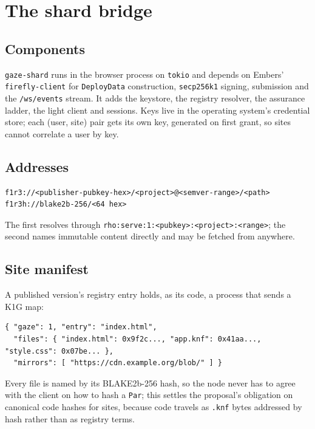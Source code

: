 \documentclass[11pt]{article}
\theoremstyle{definition}
\theoremstyle{remark}
\newcommand{\code}[1]{\texttt{#1}}
\begin{document}
\section{The shard bridge}\label{sec:shard}

\subsection{Components}
\code{gaze-shard} runs in the browser process on \code{tokio} and depends on
Embers' \code{firefly-client} for \code{DeployData} construction, \code{secp256k1}
signing, submission and the \code{/ws/events} stream. It adds the keystore, the
registry resolver, the assurance ladder, the light client and sessions. Keys live in
the operating system's credential store; each (user, site) pair gets its own key,
generated on first grant, so sites cannot correlate a user by key.

\subsection{Addresses}
\begin{lstlisting}
f1r3://<publisher-pubkey-hex>/<project>@<semver-range>/<path>
f1r3h://blake2b-256/<64 hex>
\end{lstlisting}
The first resolves through \code{rho:serve:1:<pubkey>:<project>:<range>}; the second
names immutable content directly and may be fetched from anywhere.

\subsection{Site manifest}
A published version's registry entry holds, as its code, a process that sends a K1G
map:
\begin{lstlisting}
{ "gaze": 1, "entry": "index.html",
  "files": { "index.html": 0x9f2c..., "app.knf": 0x41aa..., "style.css": 0x07be... },
  "mirrors": [ "https://cdn.example.org/blob/" ] }
\end{lstlisting}
Every file is named by its BLAKE2b-256 hash, so the node never has to agree with
the client on how to hash a \code{Par}; this settles the proposal's obligation on
canonical code hashes for sites, because code travels as \code{.knf} bytes
addressed by hash rather than as registry terms.
\end{document}
